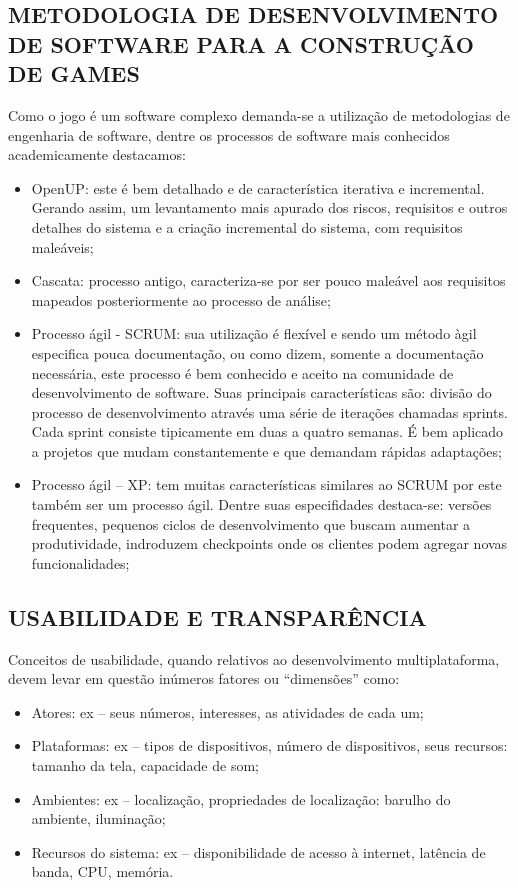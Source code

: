 \documentclass{article}
\begin{document}
\subsection{METODOLOGIA DE DESENVOLVIMENTO DE SOFTWARE PARA A CONSTRUÇÃO DE GAMES}

Como o jogo é um software complexo demanda-se a utilização de metodologias de engenharia de software, dentre os processos de software mais conhecidos academicamente destacamos:


\begin{itemize}
    \item OpenUP: este é bem detalhado e de característica iterativa e incremental. Gerando assim, um levantamento mais apurado dos riscos, requisitos e outros detalhes do sistema e a criação incremental do sistema, com requisitos maleáveis;
    \item Cascata: processo antigo, caracteriza-se por ser pouco maleável aos requisitos mapeados posteriormente ao processo de análise;
    \item Processo ágil - SCRUM: sua utilização é flexível e sendo um método àgil especifica pouca documentação, ou como dizem, somente a documentação necessária, este processo é bem conhecido e aceito na comunidade de desenvolvimento de software. Suas principais características são: divisão do processo de desenvolvimento através uma série de iterações chamadas sprints. Cada sprint consiste tipicamente em duas a quatro semanas. É bem aplicado a projetos que mudam constantemente e que demandam rápidas adaptações;
    \item Processo ágil – XP: tem muitas características similares ao SCRUM por este também ser um processo ágil. Dentre suas especifidades destaca-se: versões frequentes, pequenos ciclos de desenvolvimento que buscam aumentar a produtividade, indroduzem checkpoints onde os clientes podem agregar novas funcionalidades;
\end{itemize}

\subsection{USABILIDADE E TRANSPARÊNCIA}

    Conceitos de usabilidade, quando relativos ao desenvolvimento multiplataforma, devem levar em questão inúmeros fatores ou “dimensões” como:

\begin{itemize}
    \item Atores: ex – seus números, interesses, as atividades de cada um;
    \item Plataformas: ex – tipos de dispositivos, número de dispositivos, seus recursos: tamanho da tela, capacidade de som;
    \item Ambientes: ex – localização, propriedades de localização: barulho do ambiente, iluminação;
    \item Recursos do sistema: ex – disponibilidade de acesso à internet, latência de banda, CPU, memória.

\end{itemize}
\end{document}
